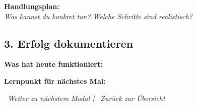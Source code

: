\vspace{0.5cm}
\textbf{Handlungsplan:}\\
\textit{Was kannst du konkret tun? Welche Schritte sind realistisch?}\\

\subsection*{\textcolor{ctmmBlue}{3. Erfolg dokumentieren}}

\textbf{Was hat heute funktioniert:}\\

\vspace{0.5cm}
\textbf{Lernpunkt für nächstes Mal:}\\

\vspace{1cm}
\begin{center}
\textit{\textcolor{ctmmBlue}{\faChevronRight~Weiter zu nächstem Modul} | \textcolor{ctmmPurple}{\faChevronLeft~Zurück zur Übersicht}}
\end{center}

